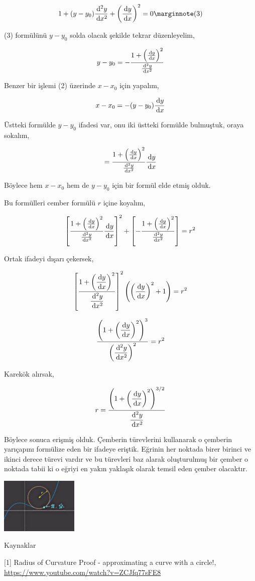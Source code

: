 \documentclass[12pt,fleqn]{article}\usepackage{../../common}
\begin{document}
$$
1 + (y-y_0) \frac{\ud^2y}{\ud x^2} +
\left( \frac{\ud y}{\ud x}  \right)^2 = 0
\mlabel{3}
$$

(3) formülünü $y-y_0$ solda olacak şekilde tekrar düzenleyelim,

$$
y-y_0 = - \frac{1 + \left( \frac{\,\mathrm{d} y}{\,\mathrm{d} x}  \right)^2}{\frac{\,\mathrm{d}^2y}{\,\mathrm{d} x^2}}
$$

Benzer bir işlemi (2) üzerinde $x-x_0$ için yapalım,

$$
x-x_0 = -(y-y_0)\frac{\,\mathrm{d} y}{\,\mathrm{d} x}
$$

Üstteki formülde $y-y_0$ ifadesi var, onu iki üstteki formülde bulmuştuk,
oraya sokalım,

$$
= \frac{1 + \left( \frac{\,\mathrm{d} y}{\,\mathrm{d} x}  \right)^2}{\frac{\,\mathrm{d}^2y}{\,\mathrm{d} x^2}}
\frac{\,\mathrm{d} y}{\,\mathrm{d} x}
$$

Böylece hem $x-x_0$ hem de $y-y_0$ için bir formül elde etmiş olduk.

Bu formülleri cember formülü $r$ içine koyalım,

$$
\left[
    \frac{1 + \left( \frac{\,\mathrm{d} y}{\,\mathrm{d} x}  \right)^2}
         {\frac{\,\mathrm{d}^2y}{\,\mathrm{d} x^2}} \frac{\,\mathrm{d} y}{\,\mathrm{d} x}
\right]^2
+
\left[
  - \frac{1 + \left( \frac{\,\mathrm{d} y}{\,\mathrm{d} x}  \right)^2}
         {\frac{\,\mathrm{d}^2y}{\,\mathrm{d} x^2}}
\right] = r^2
$$

Ortak ifadeyi dışarı çekersek, 

$$
\left[
    \dfrac{1 + \left( \dfrac{\,\mathrm{d} y}{\,\mathrm{d} x}  \right)^2}
         {\dfrac{\,\mathrm{d}^2y}{\,\mathrm{d} x^2}}
\right]^2
\left(  \left(\dfrac{\,\mathrm{d} y}{\,\mathrm{d} x}  \right)^2 + 1 \right) = r^2
$$

$$
\frac{\left( 1 +  \left( \dfrac{\,\mathrm{d} y}{\,\mathrm{d} x} \right)^2  \right)^3}
     { \left( \dfrac{\,\mathrm{d}^2y}{\,\mathrm{d} x^2}   \right)^2  }
     = r^2
$$

Karekök alırsak,

$$
r =
\frac{\left( 1 +  \left( \dfrac{\,\mathrm{d} y}{\,\mathrm{d} x} \right)^2  \right)^{3/2}}
     { \dfrac{\,\mathrm{d}^2y}{\,\mathrm{d} x^2}   }
$$


Böylece sonuca erişmiş olduk. Çemberin türevlerini kullanarak o çemberin
yarıçapını formülize eden bir ifadeye eriştik. Eğrinin her noktada birer birinci
ve ikinci derece türevi vardır ve bu türevleri baz alarak oluşturulmuş bir
çember o noktada tabii ki o eğriyi en yakın yaklaşık olarak temsil eden
çember olacaktır. 

\includegraphics[width=10em]{calc_multi_60_03.jpg}

Kaynaklar

[1] Radius of Curvature Proof - approximating a curve with a circle!,
    \url{https://www.youtube.com/watch?v=ZCJfq77sFE8}
\end{document}
